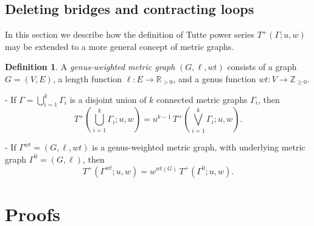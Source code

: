 \documentclass{amsart}
\theoremstyle{definition}
\newtheorem{dfn}[thm]{Definition}
\newcommand{\RR}{\mathbb{R}}
\newcommand{\ZZ}{\mathbb{Z}}
\begin{document}

\subsection{Deleting bridges and contracting loops}
In this section we describe how the definition of Tutte power series $T^+(\Gamma;u,w)$
may be extended to a more general concept of metric graphs.

\begin{dfn}
A {\em genus-weighted metric graph}
$(G,\ell, wt)$
consists of a graph $G = (V,E)$,
a length function $\ell : E \to \RR_{>0}$,
and a genus function
$wt: V \to \ZZ_{\geq 0}$.
\end{dfn}
- If $\Gamma = \bigcup_{i=1}^k \Gamma_i$ is a disjoint union of $k$ connected metric graphs $\Gamma_i$,
then 
$$
T^+(\bigcup_{i=1}^k \Gamma_i ; u,w) = u^{k-1}\, T^+(\bigvee_{i=1}^k \Gamma_i; u,w).
$$

- If $\Gamma^{wt} = (G,\ell,wt)$ is a genus-weighted metric graph,
with underlying metric graph $\Gamma^0 = (G,\ell)$,
then
$$
T^+(\Gamma^{wt}; u,w) = w^{wt(G)} \, T^+(\Gamma^0; u,w).
$$


\section{Proofs}
\end{document}
